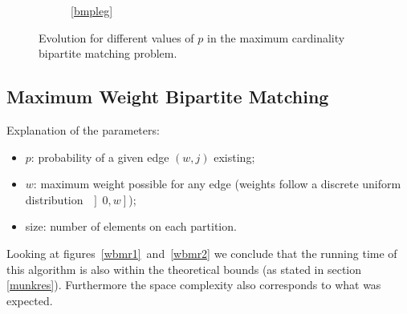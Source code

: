\documentclass[a4,11pt]{article}
\begin{document}
\begin{figure}[ht]
\begin{subfigure}[b]{0.5\textwidth}
    \centering
\end{subfigure}%
\begin{subfigure}[b]{0.5\textwidth}
    \centering
\end{subfigure}

\begin{subfigure}[b]{\textwidth}
    \centering
	\ref{bmpleg}
\end{subfigure}
\caption{Evolution for different values of $p$ in the maximum cardinality bipartite matching problem.} \label{bmr2}
\end{figure}

\subsection{Maximum Weight Bipartite Matching}
Explanation of the parameters:
\begin{itemize}
    \setlength\itemsep{-.1em}
    \item $p$: probability of a given edge $(w,j)$ existing;
    \item $w$: maximum weight possible for any edge (weights follow a discrete uniform distribution~$\left]0, w\right]$);
    \item size: number of elements on each partition.
\end{itemize}

Looking at figures~\ref{wbmr1}~and~\ref{wbmr2} we conclude that the running time of this algorithm is also within the theoretical bounds (as stated in section \ref{munkres}). Furthermore the space complexity also corresponds to what was expected.
\end{document}
